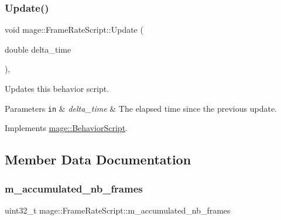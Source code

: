 \subsubsection{\texorpdfstring{Update()}{Update()}}
{\footnotesize\ttfamily void mage\+::\+Frame\+Rate\+Script\+::\+Update (\begin{DoxyParamCaption}\item[{double}]{delta\+\_\+time }\end{DoxyParamCaption})\hspace{0.3cm}{\ttfamily [override]}, {\ttfamily [virtual]}}

Updates this behavior script.


\begin{DoxyParams}[1]{Parameters}
\mbox{\tt in}  & {\em delta\+\_\+time} & The elapsed time since the previous update. \\
\hline
\end{DoxyParams}


Implements \hyperlink{classmage_1_1_behavior_script_a905b6c83640cb91d19fecab3435f6feb}{mage\+::\+Behavior\+Script}.



\subsection{Member Data Documentation}
\hypertarget{classmage_1_1_frame_rate_script_a96dc980d017ad5e1b1f00db2526cd576}{}\label{classmage_1_1_frame_rate_script_a96dc980d017ad5e1b1f00db2526cd576} 
\subsubsection{\texorpdfstring{m\+\_\+accumulated\+\_\+nb\+\_\+frames}{m\_accumulated\_nb\_frames}}
{\footnotesize\ttfamily uint32\+\_\+t mage\+::\+Frame\+Rate\+Script\+::m\+\_\+accumulated\+\_\+nb\+\_\+frames\hspace{0.3cm}{\ttfamily [private]}}

\hypertarget{classmage_1_1_frame_rate_script_ad2811547f84f1c62392e36fd8b82042d}{}\label{classmage_1_1_frame_rate_script_ad2811547f84f1c62392e36fd8b82042d} 
